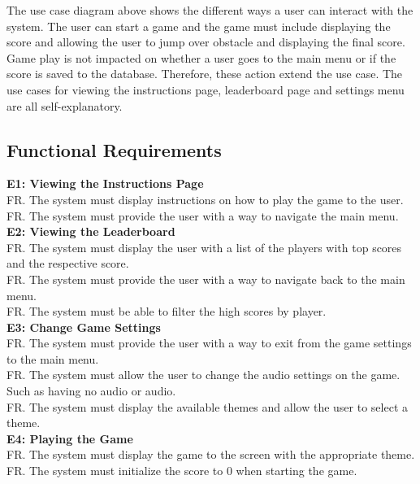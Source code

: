 \documentclass{article}
\begin{document}
The use case diagram above shows the different ways a user can interact with the system. The user can start a game and the game must include displaying the score and allowing the user to jump over obstacle and displaying the final score. Game play is not impacted on whether a user goes to the main menu or if the score is saved to the database. Therefore, these action extend the use case. The use cases for viewing the instructions page, leaderboard page and settings menu are all self-explanatory. 

\subsection{Functional Requirements}



\textbf{E1: Viewing the Instructions Page} \\
FR. The system must display instructions on how to play the game to the user. \\
FR. The system must provide the user with a way to navigate the main menu. \\

\textbf{E2: Viewing the Leaderboard} \\
FR. The system must display the user with a list of the players with top scores and the respective score.  \\
FR. The system must provide the user with a way to navigate back to the main menu. \\
FR. The system must be able to filter the high scores by player. \\

\textbf{E3: Change Game Settings} \\
FR. The system must provide the user with a way to exit from the game settings to the main menu. \\

FR. The system must allow the user to change the audio settings on the game. Such as having no audio or audio. \\

FR. The system must display the available themes and allow the user to select a theme. \\

\textbf{E4: Playing the Game} \\
FR. The system must display the game to the screen with the appropriate theme. \\

FR. The system must initialize the score to 0 when starting the game. \\
\end{document}

